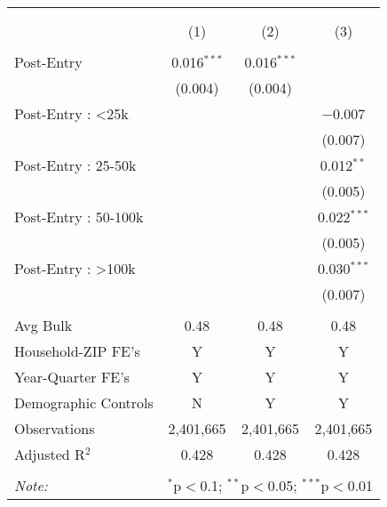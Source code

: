 
\begin{table}[!htbp] \centering 
  \caption{} 
  \label{} 
\begin{tabular}{@{\extracolsep{5pt}}lccc} 
\\[-1.8ex]\hline 
\hline \\[-1.8ex] 
\\[-1.8ex] & (1) & (2) & (3)\\ 
\hline \\[-1.8ex] 
 Post-Entry & 0.016$^{***}$ & 0.016$^{***}$ &  \\ 
  & (0.004) & (0.004) &  \\ 
  Post-Entry : <25k &  &  & $-$0.007 \\ 
  &  &  & (0.007) \\ 
  Post-Entry : 25-50k &  &  & 0.012$^{**}$ \\ 
  &  &  & (0.005) \\ 
  Post-Entry : 50-100k &  &  & 0.022$^{***}$ \\ 
  &  &  & (0.005) \\ 
  Post-Entry : >100k &  &  & 0.030$^{***}$ \\ 
  &  &  & (0.007) \\ 
 \hline \\[-1.8ex] 
Avg Bulk & 0.48 & 0.48 & 0.48 \\ 
Household-ZIP FE's & Y & Y & Y \\ 
Year-Quarter FE's & Y & Y & Y \\ 
Demographic Controls & N & Y & Y \\ 
Observations & 2,401,665 & 2,401,665 & 2,401,665 \\ 
Adjusted R$^{2}$ & 0.428 & 0.428 & 0.428 \\ 
\hline 
\hline \\[-1.8ex] 
\textit{Note:}  & \multicolumn{3}{l}{$^{*}$p$<$0.1; $^{**}$p$<$0.05; $^{***}$p$<$0.01} \\ 
\end{tabular} 
\end{table} 
